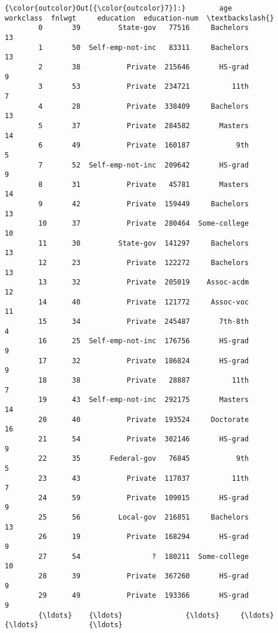 \documentclass[11pt]{article}
\begin{document}
\begin{Verbatim}[commandchars=\\\{\}]
{\color{outcolor}Out[{\color{outcolor}7}]:}        age         workclass  fnlwgt     education  education-num  \textbackslash{}
        0       39         State-gov   77516     Bachelors             13   
        1       50  Self-emp-not-inc   83311     Bachelors             13   
        2       38           Private  215646       HS-grad              9   
        3       53           Private  234721          11th              7   
        4       28           Private  338409     Bachelors             13   
        5       37           Private  284582       Masters             14   
        6       49           Private  160187           9th              5   
        7       52  Self-emp-not-inc  209642       HS-grad              9   
        8       31           Private   45781       Masters             14   
        9       42           Private  159449     Bachelors             13   
        10      37           Private  280464  Some-college             10   
        11      30         State-gov  141297     Bachelors             13   
        12      23           Private  122272     Bachelors             13   
        13      32           Private  205019    Assoc-acdm             12   
        14      40           Private  121772     Assoc-voc             11   
        15      34           Private  245487       7th-8th              4   
        16      25  Self-emp-not-inc  176756       HS-grad              9   
        17      32           Private  186824       HS-grad              9   
        18      38           Private   28887          11th              7   
        19      43  Self-emp-not-inc  292175       Masters             14   
        20      40           Private  193524     Doctorate             16   
        21      54           Private  302146       HS-grad              9   
        22      35       Federal-gov   76845           9th              5   
        23      43           Private  117037          11th              7   
        24      59           Private  109015       HS-grad              9   
        25      56         Local-gov  216851     Bachelors             13   
        26      19           Private  168294       HS-grad              9   
        27      54                 ?  180211  Some-college             10   
        28      39           Private  367260       HS-grad              9   
        29      49           Private  193366       HS-grad              9   
        {\ldots}    {\ldots}               {\ldots}     {\ldots}           {\ldots}            {\ldots}   

\end{Verbatim}
\end{document}
